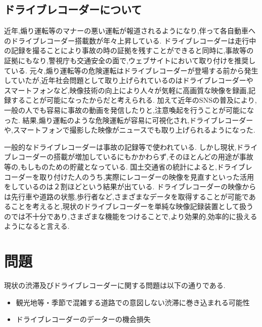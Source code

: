 

%


\subsection{ドライブレコーダーについて}
近年,煽り運転等のマナーの悪い運転が報道されるようになり,伴って各自動車へのドライブレコーダー搭載数が年々上昇している.
ドライブレコーダーは走行中の記録を撮ることにより事故の時の証拠を残すことができると同時に,事故等の証拠にもなり,警視庁も交通安全の面で,ウェブサイトにおいて取り付けを推奨している.
元々,煽り運転等の危険運転はドライブレコーダーが登場する前から発生していたが,近年社会問題として取り上げられているのはドライブレコーダーやスマートフォンなど,映像技術の向上により人々が気軽に高画質な映像を録画,記録することが可能になったからだと考えられる.
加えて近年のSNSの普及により,一般の人でも容易に事故の動画を発信したりと,注意喚起を行うことが可能になった.
結果,煽り運転のような危険運転が容易に可視化され,ドライブレコーダーや,スマートフォンで撮影した映像がニュースでも取り上げられるようになった.

一般的なドライブレコーダーは事故の記録等で使われている.
しかし現状,ドライブレコーダーの搭載が増加しているにもかかわらず,そのほとんどの用途が事故等の,もしものための貯蔵となっている.
国土交通省の統計によると,ドライブレコーダーを取り付けた人のうち,実際にレコーダーの映像を見直すといった活用をしているのは２割ほどという結果が出ている\cite{ministryofland}.
ドライブレコーダーの映像からは先行車や道路の状態,歩行者など,さまざまなデータを取得することが可能であることを考えると,現状のドライブレコーダーを単純な映像記録装置として扱うのでは不十分であり,さまざまな機能をつけることで,より効果的,効率的に扱えるようになると言える.

\section{問題}
現状の渋滞及びドライブレコーダーに関する問題は以下の通りである.

\begin{itemize}
  \item 観光地等・季節で混雑する道路での意図しない渋滞に巻き込まれる可能性
  \item ドライブレコーダーのデーターの機会損失
\end{itemize}

